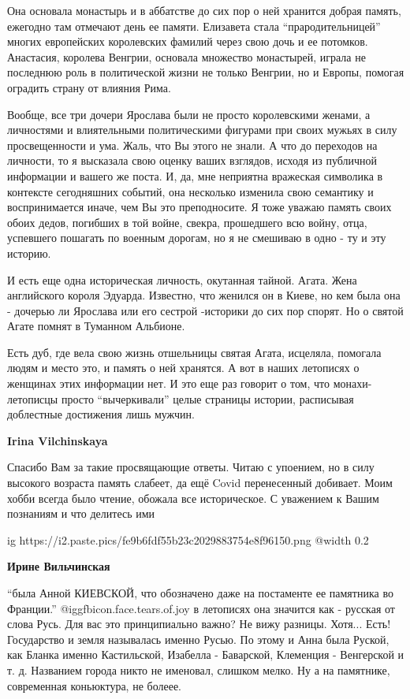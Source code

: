 \begin{itemize}
\begin{itemize}
\begin{itemize}
Она основала монастырь и в аббатстве до сих пор о ней хранится добрая память,
ежегодно там отмечают день ее памяти. Елизавета стала
\enquote{прародительницей} многих европейских королевских фамилий через свою
дочь и ее потомков. Анастасия, королева Венгрии, основала множество монастырей,
играла не последнюю роль в политической жизни не только Венгрии, но и Европы,
помогая оградить страну от влияния Рима. 

Вообще, все три дочери Ярослава были не просто королевскими женами, а
личностями и влиятельными политическими фигурами при своих мужьях в силу
просвещенности и ума. Жаль, что Вы этого не знали. А что до переходов на
личности, то я высказала свою оценку ваших взглядов, исходя из публичной
информации и вашего же поста. И, да, мне неприятна вражеская символика в
контексте сегодняшних событий, она несколько изменила свою семантику и
воспринимается иначе, чем Вы это преподносите. Я тоже уважаю память своих обоих
дедов, погибших в той войне, свекра, прошедшего всю войну, отца, успевшего
пошагать по военным дорогам, но я не смешиваю в одно - ту и эту историю. 

И есть еще одна историческая личность, окутанная тайной. Агата. Жена
английского короля Эдуарда. Известно, что женился он в Киеве, но кем была она -
дочерью ли Ярослава или его сестрой -историки до сих пор спорят. Но о святой
Агате помнят в Туманном Альбионе. 

Есть дуб, где вела свою жизнь отшельницы святая Агата, исцеляла, помогала людям
и место это, и память о ней хранятся. А вот в наших летописях о женщинах этих
информации нет. И это еще раз говорит о том, что монахи-летописцы просто
\enquote{вычеркивали} целые страницы истории, расписывая доблестные достижения
лишь мужчин.

\textbf{Irina Vilchinskaya} 

Спасибо Вам за такие просвящающие ответы. Читаю с упоением, но в силу высокого
возраста память слабеет, да ещё Covid перенесенный добивает. Моим хобби всегда
было чтение, обожала все историческое. С уважением к Вашим познаниям и что
делитесь ими

\ifcmt
  ig https://i2.paste.pics/fe9b6fdf55b23c2029883754e8f96150.png
  @width 0.2
\fi

\textbf{Ирине Вильчинская} 

\enquote{была Анной КИЕВСКОЙ, что обозначено даже на постаменте ее памятника во
Франции.}  @igg{fbicon.face.tears.of.joy}  в летописях она значится как -
русская от слова Русь. Для вас это принципиально важно? Не вижу разницы.
Хотя... Есть! Государство и земля называлась именно Русью. По этому и Анна была
Руской, как Бланка именно Кастильской, Изабелла - Баварской, Клеменция -
Венгерской и т. д. Названием города никто не именовал, слишком мелко. Ну а на
памятнике, современная коньюктура, не болеее. 


\end{itemize}
\end{itemize}
\end{itemize}
